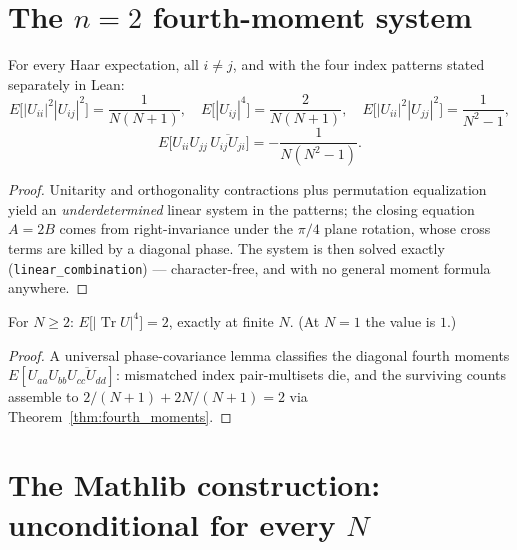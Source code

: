 \section{The \texorpdfstring{$n=2$}{n=2} fourth-moment system}

\begin{theorem}\label{thm:fourth_moments}
\leanok
{}
For every Haar expectation, all $i\neq j$, and with the four index
patterns stated separately in Lean:
\[
E\bigl[|U_{ii}|^{2}|U_{ij}|^{2}\bigr]=\frac1{N(N+1)},\quad
E\bigl[|U_{ij}|^{4}\bigr]=\frac{2}{N(N+1)},\quad
E\bigl[|U_{ii}|^{2}|U_{jj}|^{2}\bigr]=\frac1{N^{2}-1},
\]
\[
E\bigl[U_{ii}U_{jj}\,\overline{U_{ij}U_{ji}}\bigr]
=-\frac1{N(N^{2}-1)} .
\]
\end{theorem}
\begin{proof}
\leanok
{}
Unitarity and orthogonality contractions plus permutation
equalization yield an \emph{underdetermined} linear system in the
patterns; the closing equation $A=2B$ comes from right-invariance
under the $\pi/4$ plane rotation, whose cross terms are killed by a
diagonal phase. The system is then solved exactly
(\texttt{linear\_combination}) --- character-free, and with no general
moment formula anywhere.
\end{proof}

\begin{theorem}\label{thm:abs_trace_four}
\leanok
{}
For $N\geq2$: $E\bigl[|\operatorname{Tr}U|^{4}\bigr]=2$, exactly at
finite $N$. (At $N=1$ the value is $1$.)
\end{theorem}
\begin{proof}
\leanok
{}
A universal phase-covariance lemma classifies the diagonal fourth
moments $E[U_{aa}U_{bb}\overline{U_{cc}U_{dd}}]$: mismatched index
pair-multisets die, and the surviving counts assemble to
$2/(N+1)+2N/(N+1)=2$ via Theorem~\ref{thm:fourth_moments}.
\end{proof}

\section{The Mathlib construction: unconditional for every
\texorpdfstring{$N$}{N}}\label{sec:haar_construction}

